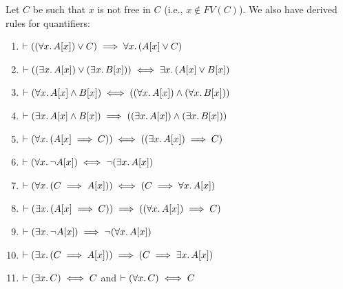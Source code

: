 \vfill\eject
\begin{node}\label{node:fs0:derived.nw:toc:predicate-logic}
Let $C$ be such that $x$ is not free in $C$ (i.e., $x\notin FV(C)$).
We also have derived rules for quantifiers:
\begin{enumerate}\setcounter{enumi}{\value{node}}
\item {} $\vdash((\forall x\ldotp A[x])\lor C)\implies\forall x\ldotp
(A[x]\lor C)$%
\item {} $\vdash((\exists x\ldotp A[x])\lor(\exists x\ldotp B[x]))\iff\exists x\ldotp(A[x]\lor B[x])$%
\item {} $\vdash(\forall x\ldotp A[x]\land B[x])\iff((\forall x\ldotp A[x])\land(\forall x\ldotp B[x]))$%
\item {} $\vdash(\exists x\ldotp A[x]\land B[x])\implies((\exists x\ldotp A[x])\land(\exists x\ldotp B[x]))$%
\item {} $\vdash(\forall x\ldotp(A[x]\implies C))\iff((\exists x\ldotp A[x])\implies C)$%
\item {} $\vdash(\forall x\ldotp\neg A[x])\iff\neg(\exists x\ldotp A[x])$%
\bigbreak
\item {} $\vdash(\forall x\ldotp(C\implies A[x]))\iff(C\implies\forall x\ldotp A[x])$%
\item {} $\vdash(\exists x\ldotp(A[x]\implies C))\implies((\forall x\ldotp A[x])\implies C)$%
\item {} $\vdash(\exists x\ldotp\neg A[x])\implies\neg(\forall x\ldotp A[x])$%
\item {} $\vdash(\exists x\ldotp(C\implies A[x]))\implies(C\implies\exists x\ldotp A[x])$%
\item {} $\vdash(\exists x\ldotp C)\iff C$ and $\vdash(\forall x\ldotp C)\iff C$
\end{enumerate}
\end{node}

\nwenddocs{}\endmoddef\nwstartdeflinemarkup{}\nwenddeflinemarkup

